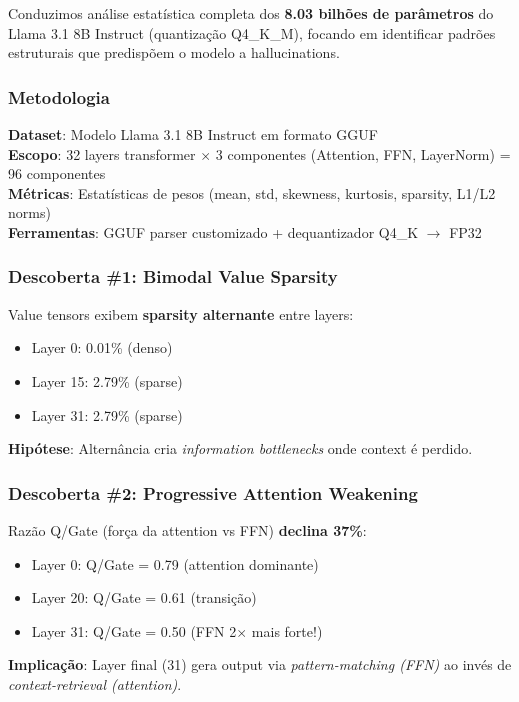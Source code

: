\documentclass[11pt]{article}
\begin{document}
Conduzimos análise estatística completa dos \textbf{8.03 bilhões de parâmetros} do Llama 3.1 8B Instruct (quantização Q4\_K\_M), focando em identificar padrões estruturais que predispõem o modelo a hallucinations.

\subsubsection{Metodologia}

\textbf{Dataset}: Modelo Llama 3.1 8B Instruct em formato GGUF\\
\textbf{Escopo}: 32 layers transformer $\times$ 3 componentes (Attention, FFN, LayerNorm) = 96 componentes\\
\textbf{Métricas}: Estatísticas de pesos (mean, std, skewness, kurtosis, sparsity, L1/L2 norms)\\
\textbf{Ferramentas}: GGUF parser customizado + dequantizador Q4\_K $\rightarrow$ FP32

\subsubsection{Descoberta \#1: Bimodal Value Sparsity}

Value tensors exibem \textbf{sparsity alternante} entre layers:
\begin{itemize}
    \item Layer 0: 0.01\% (denso)
    \item Layer 15: 2.79\% (sparse)
    \item Layer 31: 2.79\% (sparse)
\end{itemize}

\textbf{Hipótese}: Alternância cria \textit{information bottlenecks} onde context é perdido.

\subsubsection{Descoberta \#2: Progressive Attention Weakening}

Razão Q/Gate (força da attention vs FFN) \textbf{declina 37\%}:
\begin{itemize}
    \item Layer 0: Q/Gate = 0.79 (attention dominante)
    \item Layer 20: Q/Gate = 0.61 (transição)
    \item Layer 31: Q/Gate = 0.50 (FFN 2$\times$ mais forte!)
\end{itemize}

\textbf{Implicação}: Layer final (31) gera output via \textit{pattern-matching (FFN)} ao invés de \textit{context-retrieval (attention)}.
\end{document}
